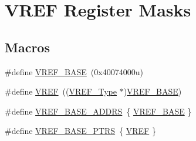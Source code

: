 \hypertarget{group___v_r_e_f___register___masks}{}\section{V\+R\+EF Register Masks}
\label{group___v_r_e_f___register___masks}
\subsection*{Macros}
\begin{DoxyCompactItemize}
\item 
\#define \mbox{\hyperlink{group___v_r_e_f___register___masks_ga4a13ce72546505561e4a780677ec0375}{V\+R\+E\+F\+\_\+\+B\+A\+SE}}~(0x40074000u)
\item 
\#define \mbox{\hyperlink{group___v_r_e_f___register___masks_ga2c9e85d22a9ba37ea589b1747af46307}{V\+R\+EF}}~((\mbox{\hyperlink{struct_v_r_e_f___type}{V\+R\+E\+F\+\_\+\+Type}} $\ast$)\mbox{\hyperlink{group___v_r_e_f___register___masks_ga4a13ce72546505561e4a780677ec0375}{V\+R\+E\+F\+\_\+\+B\+A\+SE}})
\item 
\#define \mbox{\hyperlink{group___v_r_e_f___register___masks_gac0ccacace16937d7109589180bb2650b}{V\+R\+E\+F\+\_\+\+B\+A\+S\+E\+\_\+\+A\+D\+D\+RS}}~\{ \mbox{\hyperlink{group___v_r_e_f___register___masks_ga4a13ce72546505561e4a780677ec0375}{V\+R\+E\+F\+\_\+\+B\+A\+SE}} \}
\item 
\#define \mbox{\hyperlink{group___v_r_e_f___register___masks_ga3eb17aee5de4a519ee18fe763e43865b}{V\+R\+E\+F\+\_\+\+B\+A\+S\+E\+\_\+\+P\+T\+RS}}~\{ \mbox{\hyperlink{group___v_r_e_f___register___masks_ga2c9e85d22a9ba37ea589b1747af46307}{V\+R\+EF}} \}
\end{DoxyCompactItemize}
